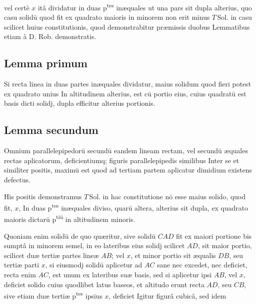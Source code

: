 \documentclass[11pt,a4paper]{article}
\begin{document}
vel certè $x$ itâ dividatur in duas p\textsuperscript{tes} inæquales ut una pars sit dupla alterius, quo casu solidū quod fit ex quadrato maioris in minorem non erit minus $T\,\mathrm{Sol.}$ in casu scilicet huius constitutionis, quod demonstrabitur præmissis duobus Lemmatibus etiam à D. Rob. demonstratis.

\subsection*{Lemma primum}

Si recta linea in duas partes inæquales dividatur, maius solidum quod fieri potest ex quadrato unius In altitudinem alterius, est cū portio eius, cuius quadratū est basis dicti solidj, dupla efficitur alterius portionis.

\subsection*{Lemma secundum}

Omnium parallelepipedorū secundū  eandem lineam rectam, vel secundū æquales rectas aplicatorum, deficientiumq; figuris parallelepipedis similibus Inter se et similiter positis, maximū est quod ad tertiam partem aplicatur dimidium existens defectus.

His positis demonstramus $T\,\mathrm{Sol.}$ in hac constitutione nō esse maius solido, quod fit, $x$, In duas p\textsuperscript{tes} inæquales diviso, quarū altera, alterius sit dupla, ex quadrato maioris dictarū p\textsuperscript{tiū} in altitudinem minoris.

 Quoniam enim solidū de quo quæritur, sive solidū $CAD$ fit ex maiori portione bis sumptâ in minorem semel, in eo lateribus eius solidj scilicet $AD$, sit maior portio, scilicet duæ tertiæ partes lineæ $AB$; vel $x$, et minor portio sit æqualis $DB$, seu tertiæ parti $x$, si eiusmodj solidū aplicetur ad $AC$ sane nec excedet, nec deficiet, recta enim $AC$, est unum ex lateribus suæ basis, sed si aplicetur ipsi $AB$, vel $x$, deficiet solido cuius quodlibet latus baseos, et altitudo erunt recta $AD$, seu $CB$, sive etiam duæ tertiæ p\textsuperscript{tes} ipsius $x$, deficiet Igitur figurâ cubicâ, sed idem
\end{document}
